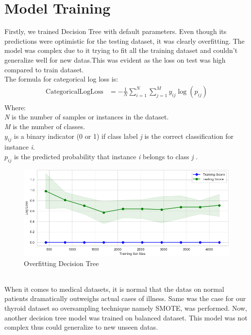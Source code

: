 \section{Model Training}
Firstly, we trained Decision Tree with default parameters. Even though its predictions were optimistic for the testing dataset, it was clearly overfitting. The model was complex due to it trying to fit all the training dataset and couldn't generalize well for new datas.This was evident as the loss on test was high compared to train dataset.\\
The formula for categorical log loss is:
\begin{equation}
\begin{aligned}
\text{CategoricalLogLoss} &= -\frac{1}{N} \sum_{i=1}^{N} \sum_{j=1}^{M} y_{ij} \log(p_{ij}) \\
\end{aligned}
\end{equation}
Where: \\
\textit{N} is the number of samples or instances in the dataset. \\
\textit{M} is the number of classes. \\
$y_{ij}$ is a binary indicator (0 or 1) if class label \textit{j} is the correct classification for instance \textit{i}. \\
$p_{ij}$ is the predicted probability that instance \textit{i} belongs to class \textit{j} \cite{cross_entropy}. 
\begin{figure}[h]
\centering
\includegraphics[scale=0.5]{learning.png}
\caption{Overfitting Decision Tree}
\end{figure}\\
When it comes to medical datasets, it is normal that the datas on normal patients dramatically outweighs actual cases of illness. Same was the case for our thyroid dataset so oversampling technique namely SMOTE, was performed.
Now, another decision tree model was trained on balanced dataset. This model was not complex thus could generalize to new unseen datas.
